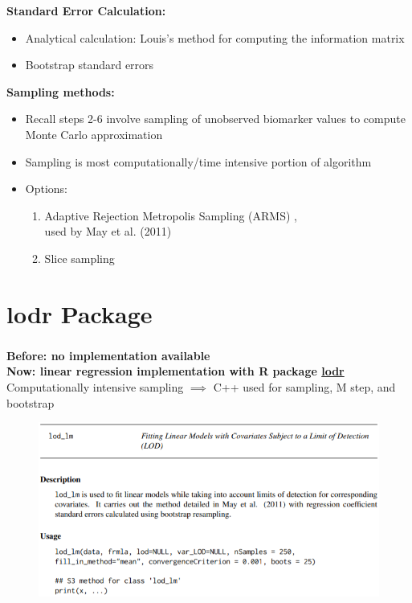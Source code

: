 \documentclass[xcolor=dvipsnames]{beamer}
\begin{document}
\begin{frame}
\textbf{Standard Error Calculation:}\\
\begin{itemize}
\item Analytical calculation: Louis's method for computing the information matrix \cite{louis_1982}
\item Bootstrap standard errors
\end{itemize}

\textbf{Sampling methods:}\\
\begin{itemize}
\item Recall steps 2-6 involve sampling of unobserved biomarker values to compute Monte Carlo approximation
\item Sampling is most computationally/time intensive portion of algorithm
\item Options:
\begin{enumerate}
\item Adaptive Rejection Metropolis Sampling (ARMS) \cite{gilks_1995},\\
used by May et al. (2011)
\item Slice sampling \cite{neal_2003}
\end{enumerate}
\end{itemize}
\end{frame}

\section{lodr Package}
\begin{frame}
\frametitle{\insertsectionhead}
\textbf{Before: no implementation available}\\
\textbf{Now: linear regression implementation with R package \underline{lodr}}\\
\vspace{0.5cm}
Computationally intensive sampling $\implies$ C++ used for sampling, M step, and bootstrap\\
\begin{figure}
	\begin{center}
		\includegraphics[scale = 0.65]{lod_lm.png}
	\end{center}
\end{figure}
\end{frame}
\end{document}
